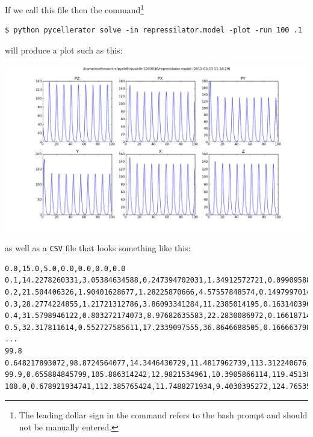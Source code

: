 If we call this file  then the command\footnote{The leading dollar sign in the command refers to the bash prompt and should not be manually entered.}
\begin{lstlisting}
$ python pycellerator solve -in repressilator.model -plot -run 100 .1
\end{lstlisting}
will produce a plot such as this:\clearpage
\begin{center}
\includegraphics[width=.9\textwidth]{repressilator.png}
\end{center}
as well as a {\tt CSV} file that looks something like this:
\begin{lstlisting}[xleftmargin=-.25in,xrightmargin=-.25in]
0.0,15.0,5.0,0.0,0.0,0.0,0.0
0.1,14.2278260331,3.05384634588,0.247394702031,1.34912572721,0.0990958803047,23.562567514
0.2,21.504406326,1.90401628677,1.28225870666,4.57557848574,0.149799701424,37.9011356108
0.3,28.2774224855,1.21721312786,3.86093341284,11.2385014195,0.16314039654,38.2545583466
0.4,31.5798946122,0.803272174073,8.97682635583,22.2830086972,0.166187145597,35.2157392832
0.5,32.317811614,0.552727585611,17.2339097555,36.8646688505,0.166663798479,31.9877430887
...
99.8 0.648217893072,98.8724564077,14.3446430729,11.4817962739,113.312240676,0.649415887468
99.9,0.655884845799,105.886314242,12.9821534961,10.3905866114,119.451386878,0.685929274901
100.0,0.678921934741,112.385765424,11.7488271934,9.4030395272,124.765357623,0.74177680618
\end{lstlisting}

